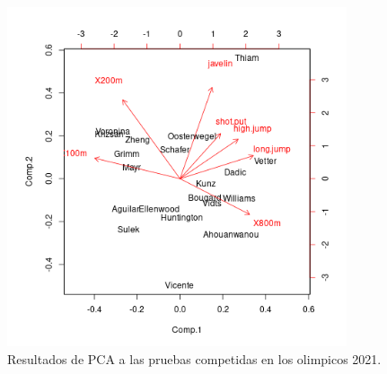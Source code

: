 \begin{figure}[H]
    \centering
    \includegraphics[width=10cm]{Graphics/heptatlon_pca.png}
    \caption{Resultados de PCA a las pruebas competidas en los olimpicos 2021.}
    \label{fig:pca}
\end{figure}